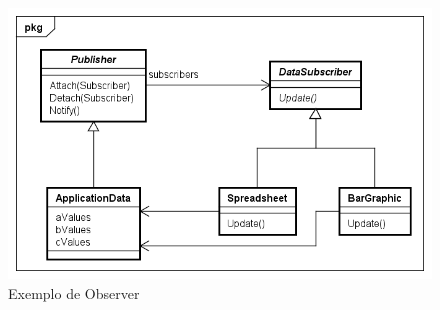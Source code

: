 \begin{figure}[htb]
	\caption{\label{observer_exemplo}Exemplo de Observer}
	\begin{center}
	    \includegraphics[scale=0.5]{5_padroes-contexto-funcional/5.3_comportamentais/5.3.07_observer/observer_exemplo.png}
	\end{center}
\end{figure}

